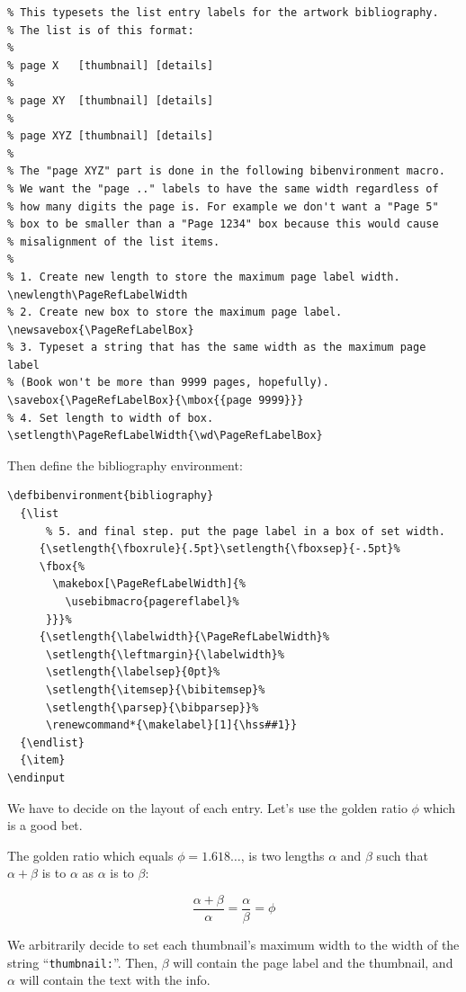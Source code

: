 \documentclass[16pt,letter,oneside,usenames,dvipsnames]{memoir}
\begin{document}
\begin{verbatim}
% This typesets the list entry labels for the artwork bibliography.
% The list is of this format:
%
% page X   [thumbnail] [details]
%
% page XY  [thumbnail] [details]
%
% page XYZ [thumbnail] [details]
%
% The "page XYZ" part is done in the following bibenvironment macro.
% We want the "page .." labels to have the same width regardless of
% how many digits the page is. For example we don't want a "Page 5"
% box to be smaller than a "Page 1234" box because this would cause
% misalignment of the list items.
%
% 1. Create new length to store the maximum page label width.
\newlength\PageRefLabelWidth
% 2. Create new box to store the maximum page label.
\newsavebox{\PageRefLabelBox}
% 3. Typeset a string that has the same width as the maximum page label
% (Book won't be more than 9999 pages, hopefully).
\savebox{\PageRefLabelBox}{\mbox{{page 9999}}}
% 4. Set length to width of box.
\setlength\PageRefLabelWidth{\wd\PageRefLabelBox}
\end{verbatim}

Then define the bibliography environment:

\begin{verbatim}
\defbibenvironment{bibliography}
  {\list
      % 5. and final step. put the page label in a box of set width.
     {\setlength{\fboxrule}{.5pt}\setlength{\fboxsep}{-.5pt}%
     \fbox{%
       \makebox[\PageRefLabelWidth]{%
         \usebibmacro{pagereflabel}%
      }}}%
     {\setlength{\labelwidth}{\PageRefLabelWidth}%
      \setlength{\leftmargin}{\labelwidth}%
      \setlength{\labelsep}{0pt}%
      \setlength{\itemsep}{\bibitemsep}%
      \setlength{\parsep}{\bibparsep}}%
      \renewcommand*{\makelabel}[1]{\hss##1}}
  {\endlist}
  {\item}
\endinput
\end{verbatim}

We have to decide on the layout of each
entry. Let's use the golden ratio $\phi$ which is a good bet.

The golden ratio which equals $\phi=1.618\ldots$, is two lengths $α$
and $β$ such that $α+β$ is to $α$ as $α$ is to $β$:

\begin{equation*}
\frac{α+β}{α}=\frac{α}{β}=\phi
\end{equation*}

We arbitrarily decide to set each thumbnail's maximum width to the width
of the string \enquote{\texttt{thumbnail:}}. Then, $β$ will contain
the page label and the thumbnail, and $α$ will contain the text with
the info.
\end{document}
